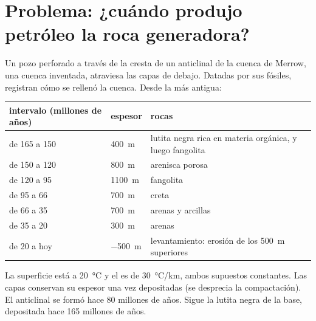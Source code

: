 \section{Problema: ¿cuándo produjo petróleo la roca generadora?}

\begin{problem}
\label{pb:g11:fossil-fuel-geology:1}
Un pozo perforado a través de la cresta de un anticlinal de la cuenca de
Merrow, una cuenca inventada, atraviesa las capas de debajo. Datadas por sus
fósiles, registran cómo se rellenó la cuenca. Desde la más antigua:
\begin{center}
\small
\begin{tabular}{|l|l|l|}
\hline
\textbf{intervalo (millones de años)} & \textbf{espesor} & \textbf{rocas} \\
\hline
de 165 a 150 & \qty{400}{m} & lutita negra rica en materia orgánica, y luego fangolita \\
de 150 a 120 & \qty{800}{m} & arenisca porosa \\
de 120 a 95 & \qty{1100}{m} & fangolita \\
de 95 a 66 & \qty{700}{m} & creta \\
de 66 a 35 & \qty{700}{m} & arenas y arcillas \\
de 35 a 20 & \qty{300}{m} & arenas \\
de 20 a hoy & \qty{-500}{m} & levantamiento: erosión de los \qty{500}{m} superiores \\
\hline
\end{tabular}
\end{center}
La superficie está a \qty{20}{\degreeCelsius} y el  es de
\qty{30}{\degreeCelsius/km}, ambos supuestos constantes. Las capas conservan
su espesor una vez depositadas (se desprecia la compactación). El anticlinal
se formó hace 80 millones de años. Sigue la lutita negra de la base,
depositada hace 165 millones de años.


\end{problem}
